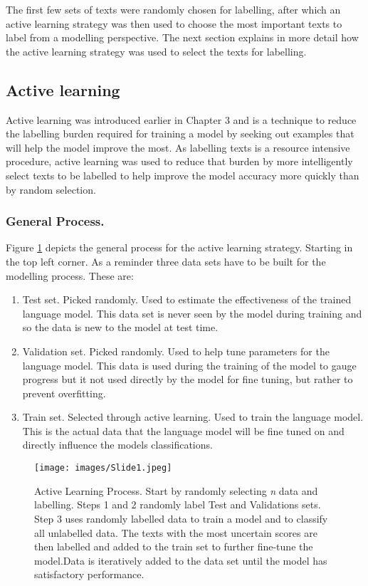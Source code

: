 The first few sets of texts were randomly chosen for labelling, after which an active learning strategy was then used to choose the most important texts to label from a modelling perspective. The next section explains in more detail how the active learning strategy was used to select the texts for labelling.


\subsection{Active learning}Active learning was introduced earlier in Chapter 3 and is a technique to reduce the labelling burden required for training a model by seeking out examples that will help the model improve the most. As labelling texts is a resource intensive procedure, active learning was used to reduce that burden by more intelligently select texts to be labelled to help improve the model accuracy more quickly than by random selection. 


\subsubsection{General Process.}  

Figure \ref{fig:active_process} depicts the general process for the active learning strategy. Starting in the top left corner. As a reminder three data sets have to be built for the modelling process. These are:

\begin{enumerate}
    \item Test set. Picked randomly. Used to estimate the effectiveness of the trained language model. This data set is never seen by the model during training and so the data is new to the model at test time.
    \item Validation set. Picked randomly. Used to help tune parameters for the language model. This data is used during the training of the model to gauge progress but it not used directly by the model for fine tuning, but rather to prevent overfitting.
    \item Train set. Selected through active learning. Used to train the language model. This is the actual data that the language model will be fine tuned on and directly influence the models classifications.
\end{enumerate}

\begin{figure}[!h]
  \centering
    \texttt{[image: images/Slide1.jpeg]}
    \caption[Active Learning Process.]{Active Learning Process. Start by randomly selecting \emph{n} data and labelling. Steps 1 and 2 randomly label Test and Validations sets. Step 3 uses randomly labelled data to train a model and to classify all unlabelled data. The texts with the most uncertain scores are then labelled and added to the train set to further fine-tune the model.Data is iteratively added to the data set until the model has satisfactory performance.}
    \label{fig:active_process}
\end{figure}

